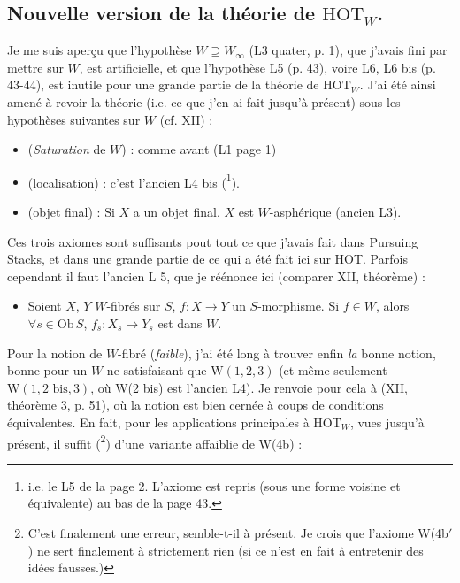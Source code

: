 \documentclass[11pt]{article}
\newcommand{\printedpage}[1]{\marginpar{\footnotesize p.~#1}}
\newcommand{\msp}[1]{\marginpar{\footnotesize [#1]}}
\begin{document}
\setcounter{footnote}{81}

\printedpage{104}

\msp{page 171}

\subsection*{Nouvelle version de la théorie de $\mathrm{HOT}_W$.}

Je me suis aperçu que l'hypothèse $W \supseteq W_\infty$ (L3 quater, p. 1), que j'avais fini par mettre sur $W$, est artificielle, et que l'hypothèse L5 (p. 43), voire L6, L6 bis (p. 43-44), est inutile pour une grande partie de la théorie de $\mathrm{HOT}_W$. J'ai été ainsi amené à revoir la théorie (i.e. ce que j'en ai fait jusqu'à présent) sous les hypothèses suivantes sur $W$ (cf. XII) :

\begin{itemize}[leftmargin=4em]
\item[W(1)] (\textit{Saturation} de $W$) : comme avant (L1 page 1)
\item[W(2)] (localisation) : c'est l'ancien L4 bis (\footnote{i.e. le L5 de la page 2. L'axiome est repris (sous une forme voisine et équivalente) au bas de la page 43.}).
\item[W(3)] (objet final) : Si $X$ a un objet final, $X$ est $W$-asphérique (ancien L3).
\end{itemize}

Ces trois axiomes sont suffisants pout tout ce que j'avais fait dans Pursuing Stacks, et dans une grande partie de ce qui a été fait ici sur HOT. Parfois cependant il faut l'ancien L 5, que je réénonce ici (comparer XII, théorème) : %

\begin{itemize}[leftmargin=4em]
\item[W(4b)] Soient $X$, $Y$ $W$-fibrés sur $S$, $f : X \longrightarrow Y$ un $S$-morphisme. Si $f \in W$, alors $\forall s \in \mathrm{Ob}\, S$, $f_s : X_s \longrightarrow Y_s$ est dans $W$.
\end{itemize}

Pour la notion de $W$-fibré (\textit{faible}), j'ai été long à trouver enfin \textit{la} bonne notion, bonne pour un $W$ ne satisfaisant que $\mathrm{W}(1,2,3)$ (et même seulement $\mathrm{W}(1, 2 \text{ bis}, 3)$, où W(2 bis) est l'ancien L4). Je renvoie pour cela à (XII, théorème 3, p. 51), où la notion est bien cernée à coups de conditions équivalentes. En fait, pour les applications principales à $\mathrm{HOT}_W$, vues jusqu'à présent, il suffit (\footnote{C'est finalement une erreur, semble-t-il à présent. Je crois que l'axiome W(4b$'$) ne sert finalement à strictement rien (si ce n'est en fait à entretenir des idées fausses.)}) d'une variante affaiblie de W(4b) :
\end{document}
